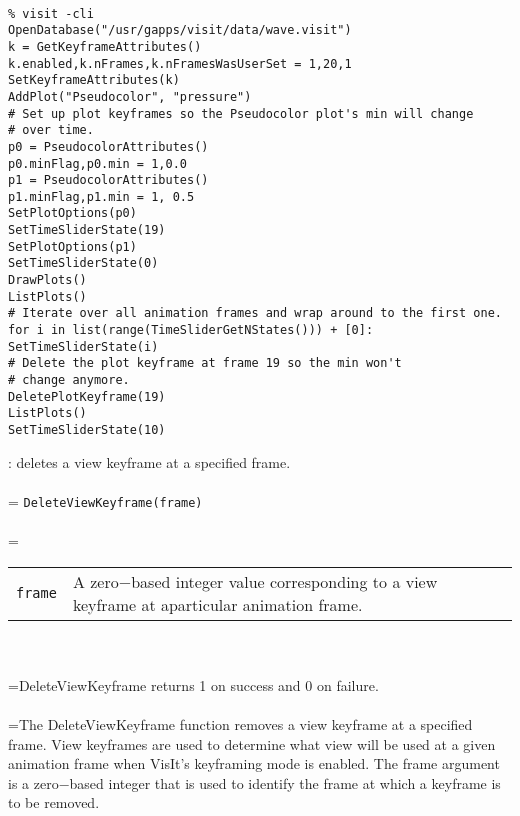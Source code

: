 \documentclass[10pt,a4paper]{report}
\begin{document}
\\[-6mm]
\begin{verbatim}% visit -cli
OpenDatabase("/usr/gapps/visit/data/wave.visit")
k = GetKeyframeAttributes()
k.enabled,k.nFrames,k.nFramesWasUserSet = 1,20,1
SetKeyframeAttributes(k)
AddPlot("Pseudocolor", "pressure")
# Set up plot keyframes so the Pseudocolor plot's min will change
# over time.
p0 = PseudocolorAttributes()
p0.minFlag,p0.min = 1,0.0
p1 = PseudocolorAttributes()
p1.minFlag,p1.min = 1, 0.5
SetPlotOptions(p0)
SetTimeSliderState(19)
SetPlotOptions(p1)
SetTimeSliderState(0)
DrawPlots()
ListPlots()
# Iterate over all animation frames and wrap around to the first one.
for i in list(range(TimeSliderGetNStates())) + [0]:
SetTimeSliderState(i)
# Delete the plot keyframe at frame 19 so the min won't 
# change anymore.
DeletePlotKeyframe(19)
ListPlots()
SetTimeSliderState(10)
\end{verbatim}
\newpage


{}
: deletes a view keyframe at a specified frame.\\[-3mm]

 \\ 
\hangindent=\parindent 
\verb!DeleteViewKeyframe(frame)!\\ [-3mm]

 \\ 
\hangindent=\parindent 
\begin{tabular}{lp{9cm}}
\verb!frame! & A zero$-$based integer value corresponding to a view keyframe at aparticular animation frame. \\
\end{tabular} \\[-2mm]


 \\ 
\hangindent=\parindent DeleteViewKeyframe returns 1 on success and 0 on failure. \\[-3mm] 

 \\ 
\hangindent=\parindent The DeleteViewKeyframe function removes a view keyframe at a specified frame. View keyframes are used to determine what view will be used at a given animation frame when VisIt's keyframing mode is enabled. The frame argument is a zero$-$based integer that is used to identify the frame at which a keyframe is to be removed. \\[-3mm] 
\end{document}
